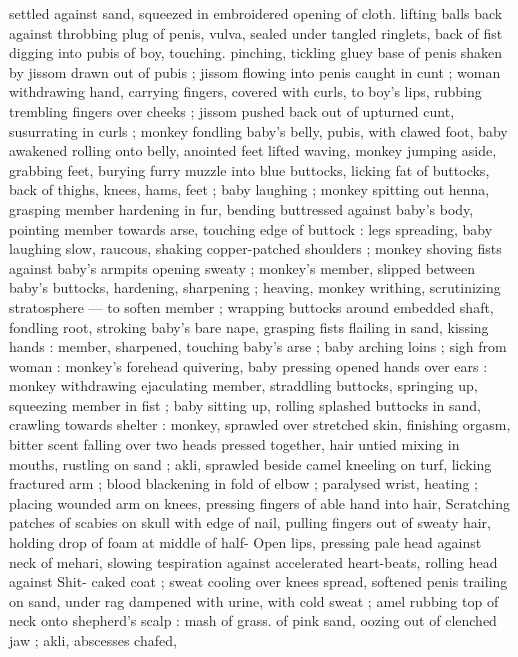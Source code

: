 settled against sand, squeezed in embroidered opening of cloth. 
lifting balls back against throbbing plug of penis, vulva, sealed under 
tangled ringlets, back of fist digging into pubis of boy, touching. 
pinching, tickling gluey base of penis shaken by jissom drawn out of 
pubis ; jissom flowing into penis caught in cunt ; woman withdrawing 
hand, carrying fingers, covered with curls, to boy's lips, rubbing 
trembling fingers over cheeks ; jissom pushed back out of upturned 
cunt, susurrating in curls ; monkey fondling baby's belly, pubis, with 
clawed foot, baby awakened rolling onto belly, anointed feet lifted 
waving, monkey jumping aside, grabbing feet, burying furry muzzle 
into blue buttocks, licking fat of buttocks, back of thighs, knees, 
hams, feet ; baby laughing ; monkey spitting out henna, grasping 
member hardening in fur, bending buttressed against baby's body, 
pointing member towards arse, touching edge of buttock : legs 
spreading, baby laughing slow, raucous, shaking copper-patched 
shoulders ; monkey shoving fists against baby's armpits opening 
sweaty ; monkey's member, slipped between baby's buttocks, 
hardening, sharpening ; heaving, monkey writhing, scrutinizing 
stratosphere --- to soften member ; wrapping buttocks around 
embedded shaft, fondling root, stroking baby's bare nape, grasping 
fists flailing in sand, kissing hands : member, sharpened, touching 
baby's arse ; baby arching loins ; sigh from woman : monkey's 
forehead quivering, baby pressing opened hands over ears : monkey 
withdrawing ejaculating member, straddling buttocks, springing up, 
squeezing member in fist ; baby sitting up, rolling splashed buttocks 
in sand, crawling towards shelter : monkey, sprawled over stretched 
skin, finishing orgasm, bitter scent falling over two heads pressed 
together, hair untied mixing in mouths, rustling on sand ; akli, 
sprawled beside camel kneeling on turf, licking fractured arm ; blood 
blackening in fold of elbow ; paralysed wrist, heating ; placing 
wounded arm on knees, pressing fingers of able hand into hair, 
Scratching patches of scabies on skull with edge of nail, pulling 
fingers out of sweaty hair, holding drop of foam at middle of half- 
Open lips, pressing pale head against neck of mehari, slowing 
tespiration against accelerated heart-beats, rolling head against 
Shit- caked coat ; sweat cooling over knees spread, softened penis 
trailing on sand, under rag dampened with urine, with cold sweat ; 
amel rubbing top of neck onto shepherd's scalp : mash of grass. of 
pink sand, oozing out of clenched jaw ; akli, abscesses chafed, 
